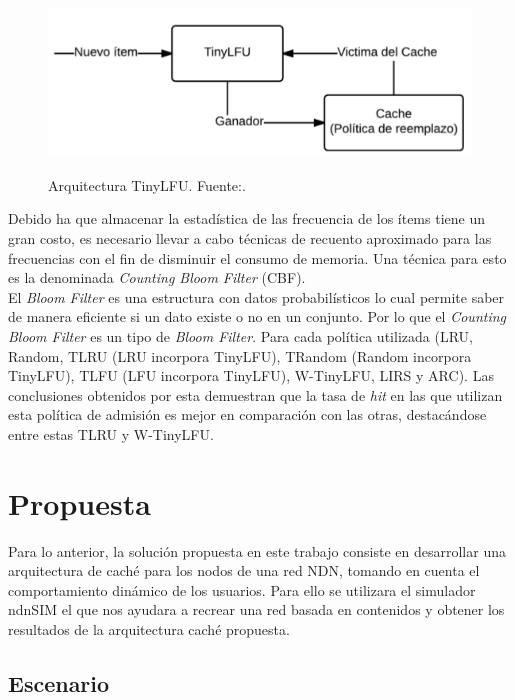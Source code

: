\documentclass[12pt]{ociamthesis}  %
\begin{document}
\begin{figure}[!htb]
	\centering
	\includegraphics[width=12cm]{Imagenes/Politica_TinyLFU}\\
	\caption{Arquitectura TinyLFU. Fuente:.\cite{einziger2014tinylfu}}
	\label{clasificacion_consulta_cc_uc}
\end{figure}

Debido ha que almacenar la estadística de las frecuencia de los ítems tiene un gran costo, es necesario llevar a cabo técnicas de recuento aproximado para las frecuencias con el fin de disminuir el consumo de memoria. Una técnica para esto es la denominada \textit{Counting Bloom Filter} (CBF).\\

El \textit{Bloom Filter} es una estructura con datos probabilísticos lo cual permite saber de manera eficiente si un dato existe o no en un conjunto. Por lo que el \textit{Counting Bloom Filter} es un tipo de \textit{Bloom Filter}.
Para cada política utilizada (LRU, Random, TLRU (LRU incorpora TinyLFU), TRandom (Random incorpora TinyLFU), TLFU (LFU incorpora TinyLFU), W-TinyLFU, LIRS y ARC). Las conclusiones obtenidos por esta demuestran que la tasa de \textit{hit} en las que utilizan esta política de admisión es mejor en comparación con las otras, destacándose entre estas TLRU y W-TinyLFU.\\


\chapter{Propuesta}

Para lo anterior, la solución propuesta en este trabajo consiste en desarrollar una arquitectura de caché para los nodos de una red NDN, tomando en cuenta el comportamiento dinámico de los usuarios. Para ello se utilizara el simulador ndnSIM el que nos ayudara a recrear una red basada en contenidos y obtener los resultados de la arquitectura caché propuesta.

\section{Escenario}
\end{document}
